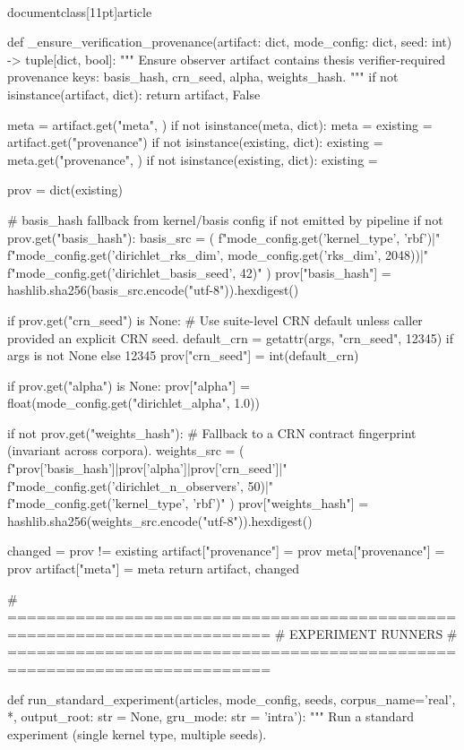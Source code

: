 \\documentclass[11pt]{article}
\begin{document}
\begin{CodeBlock}
def _ensure_verification_provenance(artifact: dict, mode_config: dict, seed: int) -> tuple[dict, bool]:
    """
    Ensure observer artifact contains thesis verifier-required provenance keys:
    basis_hash, crn_seed, alpha, weights_hash.
    """
    if not isinstance(artifact, dict):
        return artifact, False

    meta = artifact.get("meta", {})
    if not isinstance(meta, dict):
        meta = {}
    existing = artifact.get("provenance")
    if not isinstance(existing, dict):
        existing = meta.get("provenance", {})
    if not isinstance(existing, dict):
        existing = {}

    prov = dict(existing)

    # basis_hash fallback from kernel/basis config if not emitted by pipeline
    if not prov.get("basis_hash"):
        basis_src = (
            f"{mode_config.get('kernel_type', 'rbf')}|"
            f"{mode_config.get('dirichlet_rks_dim', mode_config.get('rks_dim', 2048))}|"
            f"{mode_config.get('dirichlet_basis_seed', 42)}"
        )
        prov["basis_hash"] = hashlib.sha256(basis_src.encode("utf-8")).hexdigest()

    if prov.get("crn_seed") is None:
        # Use suite-level CRN default unless caller provided an explicit CRN seed.
        default_crn = getattr(args, "crn_seed", 12345) if args is not None else 12345
        prov["crn_seed"] = int(default_crn)

    if prov.get("alpha") is None:
        prov["alpha"] = float(mode_config.get("dirichlet_alpha", 1.0))

    if not prov.get("weights_hash"):
        # Fallback to a CRN contract fingerprint (invariant across corpora).
        weights_src = (
            f"{prov['basis_hash']}|{prov['alpha']}|{prov['crn_seed']}|"
            f"{mode_config.get('dirichlet_n_observers', 50)}|"
            f"{mode_config.get('kernel_type', 'rbf')}"
        )
        prov["weights_hash"] = hashlib.sha256(weights_src.encode("utf-8")).hexdigest()

    changed = prov != existing
    artifact["provenance"] = prov
    meta["provenance"] = prov
    artifact["meta"] = meta
    return artifact, changed


# =========================================================================
# EXPERIMENT RUNNERS
# =========================================================================

def run_standard_experiment(articles, mode_config, seeds, corpus_name='real', *, output_root: str = None, gru_mode: str = 'intra'):
    """
    Run a standard experiment (single kernel type, multiple seeds).


\end{CodeBlock}
\end{document}
